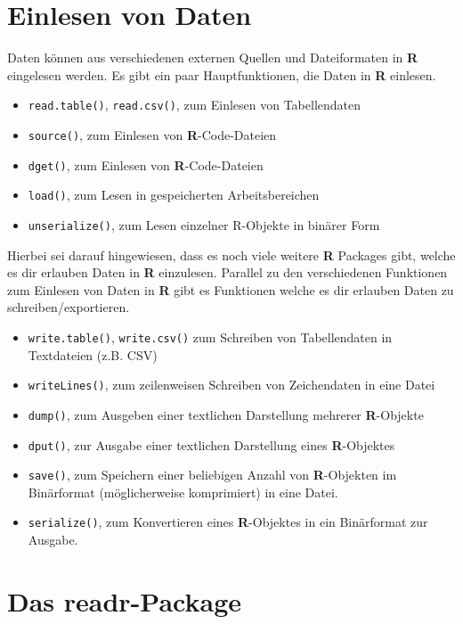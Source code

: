 \documentclass[
]{book}
\providecommand{\tightlist}{%
  \setlength{\itemsep}{0pt}\setlength{\parskip}{0pt}}
\begin{document}
\hypertarget{einlesen-von-daten}{%
\section{Einlesen von Daten}\label{einlesen-von-daten}}

Daten können aus verschiedenen externen Quellen und Dateiformaten in \textbf{R} eingelesen werden.
Es gibt ein paar Hauptfunktionen, die Daten in \textbf{R} einlesen.

\begin{itemize}
\tightlist
\item
  \texttt{read.table()}, \texttt{read.csv()}, zum Einlesen von Tabellendaten
\item
  \texttt{source()}, zum Einlesen von \textbf{R}-Code-Dateien
\item
  \texttt{dget()}, zum Einlesen von \textbf{R}-Code-Dateien
\item
  \texttt{load()}, zum Lesen in gespeicherten Arbeitsbereichen
\item
  \texttt{unserialize()}, zum Lesen einzelner R-Objekte in binärer Form
\end{itemize}

Hierbei sei darauf hingewiesen, dass es noch viele weitere \textbf{R} Packages gibt, welche es dir erlauben Daten in \textbf{R} einzulesen.
Parallel zu den verschiedenen Funktionen zum Einlesen von Daten in \textbf{R} gibt es Funktionen welche es dir erlauben Daten zu schreiben/exportieren.

\begin{itemize}
\tightlist
\item
  \texttt{write.table()}, \texttt{write.csv()} zum Schreiben von Tabellendaten in Textdateien (z.B. CSV)
\item
  \texttt{writeLines()}, zum zeilenweisen Schreiben von Zeichendaten in eine Datei
\item
  \texttt{dump()}, zum Ausgeben einer textlichen Darstellung mehrerer \textbf{R}-Objekte
\item
  \texttt{dput()}, zur Ausgabe einer textlichen Darstellung eines \textbf{R}-Objektes
\item
  \texttt{save()}, zum Speichern einer beliebigen Anzahl von \textbf{R}-Objekten im Binärformat (möglicherweise komprimiert) in eine Datei.
\item
  \texttt{serialize()}, zum Konvertieren eines \textbf{R}-Objektes in ein Binärformat zur Ausgabe.
\end{itemize}

\hypertarget{das-readr-package}{%
\section{Das readr-Package}\label{das-readr-package}}
\end{document}
